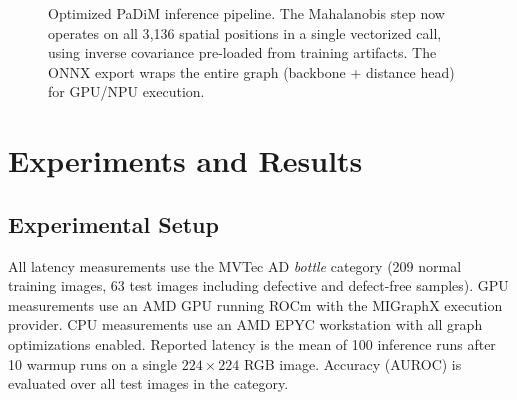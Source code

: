 \documentclass[blind]{gtac}
\begin{document}
\begin{figure}[H]
\centering
{}
\caption{Optimized PaDiM inference pipeline.  The Mahalanobis step now operates
on all 3{,}136 spatial positions in a single vectorized call, using inverse
covariance pre-loaded from training artifacts.  The ONNX export wraps the entire
graph (backbone + distance head) for GPU/NPU execution.}
\label{fig:pipeline}
\end{figure}

\section{Experiments and Results}
\label{sec:experiments}

\subsection{Experimental Setup}

All latency measurements use the MVTec AD \emph{bottle} category (209 normal
training images, 63 test images including defective and defect-free samples).
GPU measurements use an AMD GPU running ROCm with the MIGraphX execution
provider.  CPU measurements use an AMD EPYC workstation with all graph optimizations
enabled.  Reported latency is the mean of
100 inference runs after 10 warmup runs on a single $224\!\times\!224$ RGB
image.  Accuracy (AUROC) is evaluated over all test images in the category.
\end{document}
